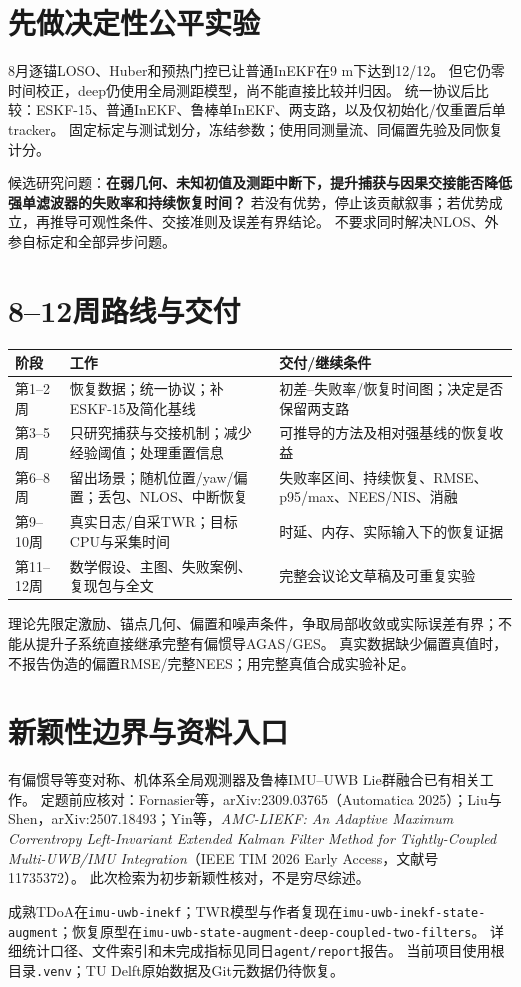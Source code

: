 \documentclass[11pt,a4paper]{ctexart}
\begin{document}
\section{先做决定性公平实验}
8月逐锚LOSO、Huber和预热门控已让普通InEKF在9 m下达到12/12。
但它仍零时间校正，deep仍使用全局测距模型，尚不能直接比较并归因。
统一协议后比较：ESKF-15、普通InEKF、鲁棒单InEKF、两支路，以及仅初始化/仅重置后单tracker。
固定标定与测试划分，冻结参数；使用同测量流、同偏置先验及同恢复计分。

候选研究问题：\textbf{在弱几何、未知初值及测距中断下，提升捕获与因果交接能否降低强单滤波器的失败率和持续恢复时间？}
若没有优势，停止该贡献叙事；若优势成立，再推导可观性条件、交接准则及误差有界结论。
不要求同时解决NLOS、外参自标定和全部异步问题。

\newpage
\section{8--12周路线与交付}
\begin{center}
\small
\begin{tabularx}{\textwidth}{l>{\raggedright\arraybackslash}X>{\raggedright\arraybackslash}X}
\toprule
阶段 & 工作 & 交付/继续条件\\
\midrule
第1--2周 & 恢复数据；统一协议；补ESKF-15及简化基线 & 初差--失败率/恢复时间图；决定是否保留两支路\\
第3--5周 & 只研究捕获与交接机制；减少经验阈值；处理重置信息 & 可推导的方法及相对强基线的恢复收益\\
第6--8周 & 留出场景；随机位置/yaw/偏置；丢包、NLOS、中断恢复 & 失败率区间、持续恢复、RMSE、p95/max、NEES/NIS、消融\\
第9--10周 & 真实日志/自采TWR；目标CPU与采集时间 & 时延、内存、实际输入下的恢复证据\\
第11--12周 & 数学假设、主图、失败案例、复现包与全文 & 完整会议论文草稿及可重复实验\\
\bottomrule
\end{tabularx}
\end{center}
理论先限定激励、锚点几何、偏置和噪声条件，争取局部收敛或实际误差有界；不能从提升子系统直接继承完整有偏惯导AGAS/GES。
真实数据缺少偏置真值时，不报告伪造的偏置RMSE/完整NEES；用完整真值合成实验补足。

\section{新颖性边界与资料入口}
有偏惯导等变对称、机体系全局观测器及鲁棒IMU--UWB Lie群融合已有相关工作。
定题前应核对：Fornasier等，arXiv:2309.03765（Automatica 2025）；Liu与Shen，arXiv:2507.18493；Yin等，\emph{AMC-LIEKF: An Adaptive Maximum Correntropy Left-Invariant Extended Kalman Filter Method for Tightly-Coupled Multi-UWB/IMU Integration}（IEEE TIM 2026 Early Access，文献号11735372）。
此次检索为初步新颖性核对，不是穷尽综述。

成熟TDoA在\texttt{imu-uwb-inekf}；TWR模型与作者复现在\texttt{imu-uwb-inekf-state-augment}；恢复原型在\texttt{imu-uwb-state-augment-deep-coupled-two-filters}。
详细统计口径、文件索引和未完成指标见同日\texttt{agent/report}报告。
当前项目使用根目录\texttt{.venv}；TU Delft原始数据及Git元数据仍待恢复。
\end{document}
